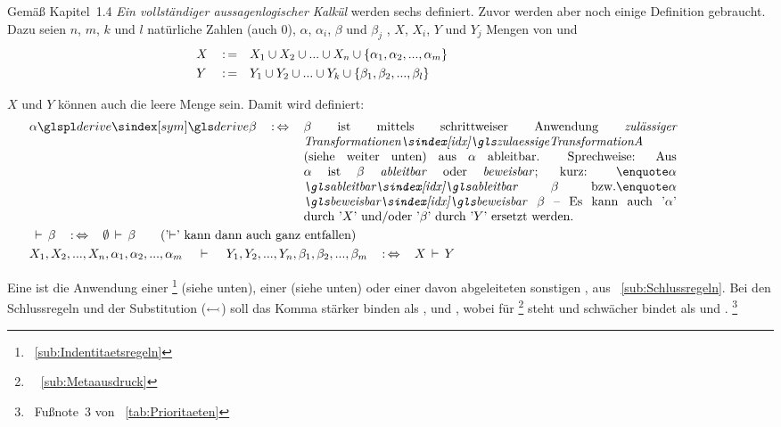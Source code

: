 Gemäß \cite{bib:Rautenberg} Kapitel~1.4 \emph{Ein vollständiger aussagenlogischer Kalkül} werden sechs  definiert. Zuvor werden aber noch einige Definition gebraucht. Dazu seien $n$, $m$, $k$ und $l$ natürliche Zahlen (auch 0), $\alpha$, $\alpha_i$, $\beta$ und $\beta_j$ , $X$, $X_i$, $Y$ und $Y_j$ Mengen von  und
\begin{align}
	&X&&\operatorname{:=}&&X_1\cup X_2\cup...\cup X_n\cup\{\alpha_1,\alpha_2,...,\alpha_m\}
	\\
	&Y&&\operatorname{:=}&&Y_1\cup Y_2\cup...\cup Y_k\cup\{\beta_1, \beta_2, ...,\beta_l \}
	&&&&&&&&&&&&&&&&&&&&
\end{align}

$X$ und $Y$ können auch die leere Menge sein. Damit wird definiert:
\begin{align}
	& \alpha \glsSym{derive} \beta \quad \metadefeq \quad
	\parbox[t]{10.5cm}{%
	$\beta$ ist mittels schrittweiser Anwendung \emph{\glsIdxBg{zulaessigeTransformationA}{zulässiger Transformationen}} (siehe weiter unten) aus $\alpha$ ableitbar.
	Sprechweise: Aus $\alpha$ ist $\beta$ \emph{ableitbar} oder \emph{beweisbar};
	kurz: \strqt{$\alpha$ \emph{\glsIdx{ableitbar}} $\beta$} \textbzw \strqt{$\alpha$ \emph{\glsIdx{beweisbar}} $\beta$}
	-- Es kann auch \symqt{$\alpha$} durch \symqt{$X$} und/oder \symqt{$\beta$} durch \symqt{$Y$} ersetzt werden.
	}
	\label{def:ableitbar}
	\\
	& \derive \beta \quad \metadefeq \quad \emptyset \derive \beta \qquad \text{(\charqt{\textderive} kann dann auch ganz entfallen)}
	\\
	&             X_1, X_2, ...,X_n, \alpha_1, \alpha_2, ..., \alpha_m \quad
	\derive \quad Y_1, Y_2, ...,Y_n,  \beta_1,  \beta_2,  ..., \beta_m \quad
	\metadefeq \quad X \derive Y
	\label{def:ableitbarKurz} \formulatoleft
\end{align}

Eine \emph{} ist die Anwendung einer \emph{}\footnote{\seename~\vref{sub:Indentitaetsregeln}} (siehe unten), einer \emph{} (siehe unten) oder einer davon abgeleiteten sonstigen \emph{}, \textzB aus \subsectionname~\vref{sub:Schlussregeln}.
Bei den Schlussregeln und der Substitution ($\subst$) soll das Komma stärker binden als \symqt{$\derive$}, \symqt{$\subst$} und \symqt{$\und$}, wobei
\symqt{$\und$} für  \textbzw {}%
\footnote{\seename\ \subsectionname~\vref{sub:Metaausdruck}}
steht und schwächer bindet als \symqt{$\derive$} und \symqt{$\subst$}.%
\footnote{\seename\ Fußnote~3 von \tablename~\vref{tab:Prioritaeten}}

